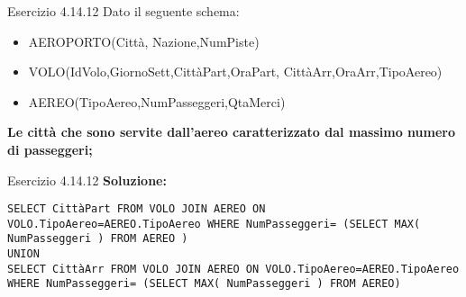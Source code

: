 %
\begin{frame}{Esercizio 4.14.12}
    Dato il seguente schema:
    \begin{itemize}
        \item AEROPORTO(Citt\`a, Nazione,NumPiste)
        \item VOLO(IdVolo,GiornoSett,Citt\`aPart,OraPart,
        Citt\`aArr,OraArr,TipoAereo)
        \item AEREO(TipoAereo,NumPasseggeri,QtaMerci)
    \end{itemize}
    \vspace{1em}
    
    \textbf{Le citt\`a che sono servite dall'aereo caratterizzato dal massimo numero di passeggeri;}
\end{frame}
\begin{frame}{Esercizio 4.14.12}
    \textbf{Soluzione:}
    \vspace{1em}
    
    \texttt{SELECT Citt\`aPart FROM VOLO JOIN AEREO ON VOLO.TipoAereo=AEREO.TipoAereo WHERE NumPasseggeri=      (SELECT MAX( NumPasseggeri ) FROM AEREO )
    \\ UNION
    \\ SELECT Citt\`aArr FROM VOLO JOIN AEREO ON VOLO.TipoAereo=AEREO.TipoAereo WHERE NumPasseggeri=      (SELECT MAX( NumPasseggeri ) FROM AEREO)}
\end{frame}
